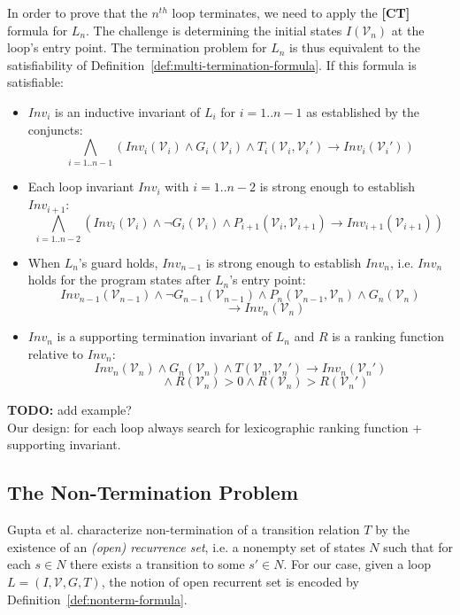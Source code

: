 \documentclass[preprint]{sigplanconf}
\theoremstyle{definition}
\newcommand{\todo}[1]{{\bf TODO:} #1}
\begin{document}
In order to prove that the $n^{th}$ loop terminates, we need to apply the {\bf [CT]} formula for $L_n$.
The challenge is determining the initial states  $I(\mathcal{V}_n)$ at the loop's entry point.  
The termination problem for $L_n$ is thus equivalent to the satisfiability of
Definition~\ref{def:multi-termination-formula}.  If this formula is satisfiable:
\begin{itemize}
\item $Inv_i$ is an inductive invariant of $L_i$ for $i=1..{n-1}$ as established by the conjuncts:
$$\bigwedge_{i=1..n{-}1} (Inv_i(\mathcal{V}_i) \wedge G_i(\mathcal{V}_i) \wedge T_i(\mathcal{V}_i, \mathcal{V}_i') \rightarrow Inv_i(\mathcal{V}_i')) $$

\item Each loop invariant $Inv_i$ with $i=1..{n-2}$ is strong enough to establish $Inv_{i+1}$:
$$\bigwedge_{i=1..n{-}2} (Inv_i(\mathcal{V}_i) \wedge \lnot G_i(\mathcal{V}_i) \wedge P_{i+1}(\mathcal{V}_i, \mathcal{V}_{i+1}) {\rightarrow} Inv_{i+1}(\mathcal{V}_{i+1})) ~$$

\item When $L_n$'s guard holds, $Inv_{n-1}$ 
is strong enough to establish $Inv_n$, i.e. $Inv_n$ holds for the program states after $L_n$'s entry point:
$$ Inv_{n-1}(\mathcal{V}_{n-1}) \wedge \lnot G_{n-1}(\mathcal{V}_{n-1}) \wedge P_n(\mathcal{V}_{n-1},\mathcal{V}_n) \wedge G_n(\mathcal{V}_n) $$
$$\qquad\qquad\rightarrow Inv_n(\mathcal{V}_n)$$

\item $Inv_n$ is a supporting termination invariant of $L_n$ and $R$ is a ranking function relative to $Inv_n$:
$$Inv_n(\mathcal{V}_n) \wedge G_n(\mathcal{V}_n) \wedge T(\mathcal{V}_n, \mathcal{V}_n') \rightarrow Inv_n(\mathcal{V}_n')$$
$$ \qquad \qquad \wedge R(\mathcal{V}_n) > 0 \wedge R(\mathcal{V}_n) > R(\mathcal{V}_n')$$
\end{itemize}

\todo{add example?}\\

Our design: for each loop always search for lexicographic ranking function + supporting invariant.

\subsection{The Non-Termination Problem}

Gupta et al. \cite{DBLP:conf/popl/GuptaHMRX08} characterize non-termination of a transition relation $T$ by the existence of an \emph{(open) recurrence set},
i.e. a nonempty set of states $N$ such that for each $s \in N$ there
exists a transition to some $s'\in N$. 
For our case, given a loop $L = (I,\mathcal{V},G,T)$, the notion of open recurrent set is encoded by Definition~\ref{def:nonterm-formula}.
\end{document}
